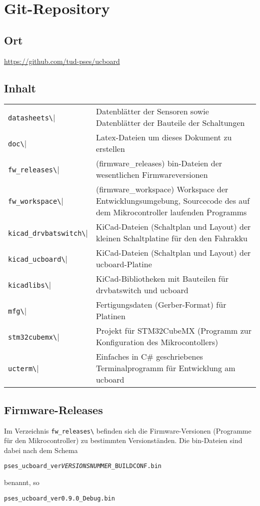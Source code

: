 

\chapter{Git-Repository}


\section{Ort}

\href{https://github.com/tud-pses/ucboard}{\color[rgb]{0,0,1}https://github.com/tud-pses/ucboard}

\section{Inhalt}

\begin{tabular}{lp{12cm}}
	\verb|datasheets\| & Datenblätter der Sensoren sowie Datenblätter der Bauteile der Schaltungen \\
	\verb|doc\| & Latex-Dateien um dieses Dokument zu erstellen \\
	\verb|fw_releases\| & (firmware\_releases) bin-Dateien der wesentlichen Firmwareversionen \\
	\verb|fw_workspace\| & (firmware\_workspace) Workspace der Entwicklungsumgebung, Sourcecode des auf dem Mikrocontroller laufenden Programms \\
	\verb|kicad_drvbatswitch\| & KiCad-Dateien (Schaltplan und Layout) der kleinen Schaltplatine für den den Fahrakku \\
	\verb|kicad_ucboard\| & KiCad-Dateien (Schaltplan und Layout) der ucboard-Platine \\
	\verb|kicadlibs\| & KiCad-Bibliotheken mit Bauteilen für drvbatswitch und ucboard \\
	\verb|mfg\| & Fertigungsdaten (Gerber-Format) für Platinen \\
	\verb|stm32cubemx\| & Projekt für STM32CubeMX (Programm zur Konfiguration des Mikrocontollers) \\
	\verb|ucterm\| & Einfaches in C\# geschriebenes Terminalprogramm für Entwicklung am ucboard
\end{tabular}


\section{Firmware-Releases}

Im Verzeichnis \verb|fw_releases\| befinden sich die Firmware-Versionen (Programme für den Mikrocontroller) zu bestimmten Versionständen. Die bin-Dateien sind dabei nach dem Schema
\begin{center}
	\texttt{pses\_ucboard\_ver\textit{VERSIONSNUMMER}\_\texttt{BUILDCONF}.bin}
\end{center}
benannt, so \zB
\begin{center}
	\texttt{pses\_ucboard\_ver0.9.0\_Debug.bin}
\end{center}

